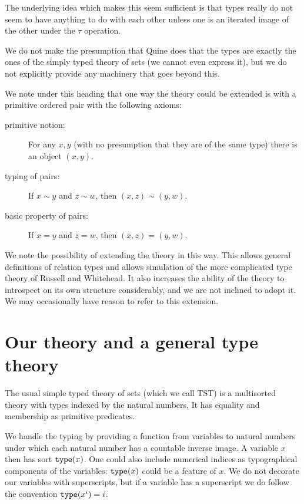 \documentclass[12pt]{article}
\begin{document}
\begin{description}
The underlying idea which makes this seem sufficient is that types really do not seem to have anything to do with each other unless one is an iterated image of the other under the $\tau$ operation.

We do not make the presumption that Quine does that the types are exactly the ones of the simply typed theory of sets (we cannot even express it), but we do not explicitly provide any machinery that goes beyond this.

We note under this heading that one way the theory could be extended is with a primitive ordered pair with the following axioms:

\begin{description}

\item[primitive notion:]  For any $x,y$ (with no presumption that they are of the same type) there is an object $(x,y)$.

\item[typing of pairs:]  If $x \sim y$ and $z \sim w$, then $(x,z) \sim (y,w)$.

\item[basic property of pairs:]  If $x=y$ and $z=w$, then $(x,z)=(y,w)$.

\end{description}

We note the possibility of extending the theory in this way.  This allows general definitions of relation types and allows simulation of the more complicated type theory of Russell and Whitehead.  It also increases the ability
of the theory to introspect on its own structure considerably, and we are not inclined to adopt it.  We may occasionally have reason to refer to this extension.

\end{description}

\section{Our theory and a general type theory}

The usual simple typed theory of sets (which we call TST) is a multisorted theory with types indexed by the natural numbers,  It has equality and membership as primitive predicates.

We handle the typing by providing a function from variables to natural numbers under which each natural number has a countable inverse image.  A variable $x$ then has sort ${\tt type}(x)$.  One could also include numerical indices as typographical components of the variables:  ${\tt type}(x)$ could be a feature of $x$.  We do not decorate our
variables with superscripts, but if a variable has a superscript we do follow the convention ${\tt type}(x^i)=i$.
\end{document}
